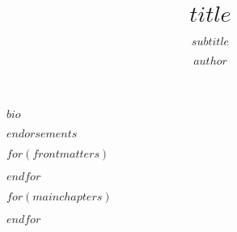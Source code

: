 \documentclass[nemilov1]{Nemilov}
\begin{document}
\frontmatter



\title{$title$}
\subtitle{$subtitle$}


\author{$author$}

\maketitle

\setcounter{page}{5}

$bio$

\bigskip

$endorsements$

\bigskip

\tableofcontents

$for(frontmatters)$

$endfor$


\mainmatter


$for(mainchapters)$

$endfor$

%
%

\appendix

%

\cleardoublepage




\cleardoublepage
\printindex
\cleardoublepage


\clearpage


\end{document}
